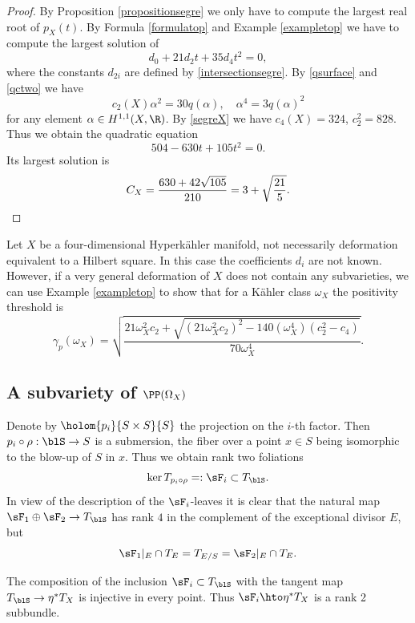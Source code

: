\begin{proof}
By Proposition \ref{propositionsegre} we only have to compute the
largest real root of $p_X(t)$.
By Formula \eqref{formulatop} and Example \ref{exampletop}
we have to compute the largest solution of
\[
d_0 + 21 d_2 t + 35 d_4 t^2 = 0,
\]
where the constants $d_{2i}$ are defined by \eqref{intersectionsegre}.
By \eqref{qsurface} and \eqref{qctwo} we have
\[
c_2(X)\alpha^2=30 q(\alpha), \quad \alpha^4=3 q(\alpha)^2
\]
for any element $\alpha\in H^{1,1}(X, \R)$.
By \eqref{segreX} we have $c_4(X)=324$, $c_2^2=828$. Thus we
obtain the quadratic equation
\[
504 - 630 t + 105 t^2 = 0.
\]
Its largest solution is
\[
C_X = \frac{630 + 42 \sqrt{105}}{210} = 3 + \sqrt{\frac{21}{5}}.\qedhere
\]
\end{proof}

\begin{remark}
Let $X$ be a four-dimensional Hyperkähler manifold, not necessarily deformation equivalent to a Hilbert square.
In this case the coefficients $d_i$ are not known. However, if a very general deformation of $X$ does not contain any subvarieties, we can use Example \ref{exampletop} to show that
for a Kähler class $\omega_X$ the
positivity threshold is
\[
\gamma_p(\omega_X)=\sqrt{
\frac{21 \omega_X^2 c_2+\sqrt{(21\omega_X^2c_2)^2- 140(\omega_X^4)(c_2^2-c_4) }}{70\omega_X^4}}.
\]
\end{remark}

\subsection{A subvariety of $\PP(\Omega_X)$} \label{subsectionZ}

Denote by $\holom{p_i}{S \times S}{S}$ the projection on the $i$-th factor.
Then $p_i \circ \rho: \blS \to S$ is a submersion,
the fiber over a point $x \in S$ being isomorphic to the blow-up of $S$ in $x$.
Thus we obtain rank two foliations
\[
\ker T_{p_i \circ \rho} =: \sF_i \subset T_{\blS}.
\]
In view of the description of the $\sF_i$-leaves it is clear that the natural map $\sF_1 \oplus \sF_2 \to T_{\blS}$ has rank $4$ in the complement of the exceptional divisor $E$, but
\[
\sF_1|_E \cap T_E = T_{E/S} = \sF_2|_E \cap T_E.
\]

\begin{lemma} \label{lemmainjection}
The composition of the inclusion $\sF_i \subset T_{\blS}$ with the tangent map $T_{\blS} \to \eta^* T_X$
is injective in every point. Thus $\sF_i \hto \eta^* T_X$ is a rank 2 subbundle.
\end{lemma}

